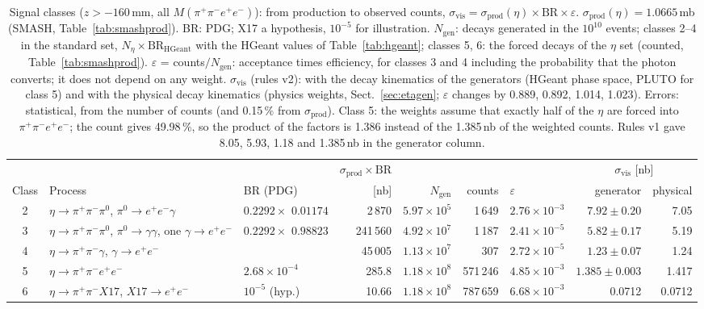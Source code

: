 \documentclass[11pt,a4paper]{article}
\newcommand{\piz}{\ensuremath{\pi^{0}}\xspace}
\newcommand{\ee}{\ensuremath{e^{+}e^{-}}\xspace}
\newcommand{\pipi}{\ensuremath{\pi^{+}\pi^{-}}\xspace}
\newcommand{\ppee}{\ensuremath{\pi^{+}\pi^{-}e^{+}e^{-}}\xspace}
\newcommand{\Mfour}{\ensuremath{M(\pi^{+}\pi^{-}e^{+}e^{-})}\xspace}
\begin{document}
\begin{table}[!htbp]
\centering
\caption{Signal classes ($z>-160$\,mm, all $\Mfour$): from production to observed counts,
$\sigma_{\mathrm{vis}} = \sigma_{\mathrm{prod}}(\eta)\times\mathrm{BR}\times\varepsilon$.
$\sigma_{\mathrm{prod}}(\eta) = 1.0665$\,mb (SMASH, Table~\ref{tab:smashprod}).
BR: PDG; X17 a hypothesis, $10^{-5}$ for illustration.
$N_{\mathrm{gen}}$: decays generated in the $10^{10}$ events; classes 2--4 in the standard set,
$N_\eta\times\mathrm{BR}_{\mathrm{HGeant}}$ with the HGeant values of Table~\ref{tab:hgeant}; classes 5, 6:
the forced decays of the $\eta$ set (counted, Table~\ref{tab:smashprod}).
$\varepsilon$ = counts$/N_{\mathrm{gen}}$: acceptance times efficiency, for classes 3 and 4 including the
probability that the photon converts; it does not depend on any weight. $\sigma_{\mathrm{vis}}$ (rules
v2): with the decay kinematics of the generators (HGeant phase space, PLUTO for class 5) and with
the physical decay kinematics (physics weights, Sect.~\ref{sec:etagen}; $\varepsilon$ changes by
0.889, 0.892, 1.014, 1.023). Errors: statistical, from the number of counts (and 0.15\,\% from
$\sigma_{\mathrm{prod}}$). Class 5: the weights assume that exactly half of the $\eta$ are forced into
\ppee; the count gives 49.98\,\%, so the product of the factors is 1.386 instead of the 1.385\,nb of the
weighted counts. Rules v1 gave 8.05, 5.93, 1.18 and 1.385\,nb in the generator column.}
\label{tab:cls}
\footnotesize
\setlength{\tabcolsep}{3.5pt}
\begin{tabular}{@{}c >{\raggedright\arraybackslash}p{3.0cm} >{\raggedright\arraybackslash}p{1.55cm} r r r l r r@{}}
\toprule
 & & & $\sigma_{\mathrm{prod}}\times\mathrm{BR}$ & & & & \multicolumn{2}{c}{$\sigma_{\mathrm{vis}}$ [nb]} \\
Class & Process & BR (PDG) & [nb] & $N_{\mathrm{gen}}$ & counts & $\varepsilon$ & generator & physical \\
\midrule
2 & $\eta\to\pipi\piz$, $\piz\to\ee\gamma$ & $0.2292\times$ $0.01174$ & 2\,870 & $5.97\times10^{5}$ & 1\,649 & $2.76\times10^{-3}$ & $7.92\pm0.20$ & 7.05 \\
3 & $\eta\to\pipi\piz$, $\piz\to\gamma\gamma$, one $\gamma\to\ee$ & $0.2292\times$ $0.98823$ & 241\,560 & $4.92\times10^{7}$ & 1\,187 & $2.41\times10^{-5}$ & $5.82\pm0.17$ & 5.19 \\
4 & $\eta\to\pipi\gamma$, $\gamma\to\ee$ & 0.0422 & 45\,005 & $1.13\times10^{7}$ & 307 & $2.72\times10^{-5}$ & $1.23\pm0.07$ & 1.24 \\
5 & $\eta\to\ppee$ & $2.68\times10^{-4}$ & 285.8 & $1.18\times10^{8}$ & 571\,246 & $4.85\times10^{-3}$ & $1.385\pm0.003$ & 1.417 \\
6 & $\eta\to\pipi X17$, $X17\to\ee$ & $10^{-5}$ (hyp.) & 10.66 & $1.18\times10^{8}$ & 787\,659 & $6.68\times10^{-3}$ & 0.0712 & 0.0712 \\
\bottomrule
\end{tabular}
\end{table}
\end{document}
